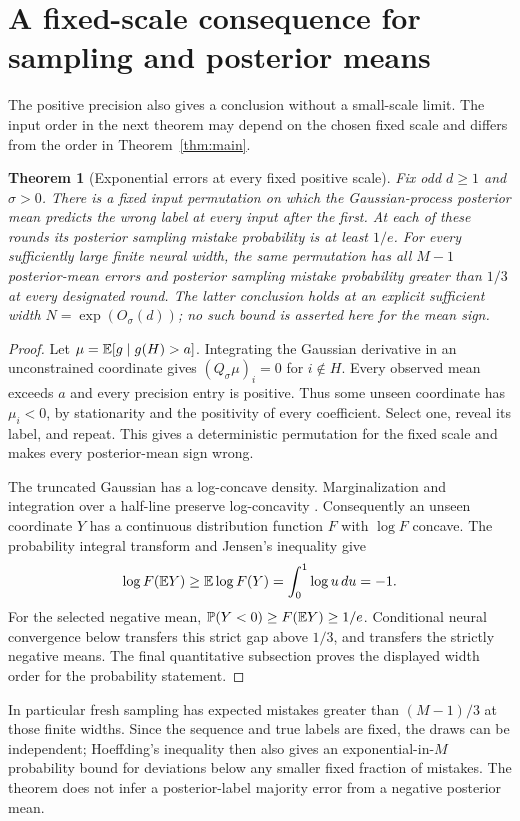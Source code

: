 \documentclass[11pt]{article}
\newtheorem{theorem}{Theorem}
\newcommand{\Pp}{\mathbb P}\newcommand{\one}{\mathbf1}
\begin{document}
\section{A fixed-scale consequence for sampling and posterior means}
The positive precision also gives a conclusion without a small-scale
limit. The input order in the next theorem may depend on the chosen
fixed scale and differs from the order in Theorem~\ref{thm:main}.

\begin{theorem}[Exponential errors at every fixed positive scale]\label{thm:fixed}
Fix odd $d\ge1$ and $\sigma>0$. There is a fixed input permutation
on which the Gaussian-process posterior mean predicts the wrong label
at every input after the first. At each of these rounds its posterior
sampling mistake probability is at least $1/e$.
For every sufficiently large finite neural width, the same permutation
has all $M-1$ posterior-mean errors and posterior sampling mistake
probability greater than $1/3$ at every designated round.
The latter conclusion holds at an explicit sufficient width
$N=\exp(O_\sigma(d))$; no such bound is asserted here for the mean sign.
\end{theorem}
\begin{proof}
Let $\mu=\mathbb E[g\mid g(H)>a]$. Integrating the Gaussian derivative in
an unconstrained coordinate gives $(Q_\sigma\mu)_i=0$ for $i\notin H$.
Every observed mean exceeds $a$ and every precision entry is positive.
Thus some unseen coordinate has $\mu_i<0$, by stationarity and the positivity of every coefficient. Select one, reveal its label, and repeat. This gives a deterministic
permutation for the fixed scale and makes every posterior-mean sign wrong.

The truncated Gaussian has a log-concave density. Marginalization and
integration over a half-line preserve log-concavity \cite{prekopa}.
Consequently an unseen coordinate $Y$ has a continuous distribution
function $F$ with $\log F$ concave. The probability integral transform
and Jensen's inequality give
\[
             \log F(\mathbb E Y)\ge\mathbb E\log F(Y)
                             =\int_0^1\log u\,du=-1.
\]
For the selected negative mean,
$\Pp(Y<0)\ge F(\E Y)\ge1/e$.
Conditional neural convergence below transfers this strict gap above
$1/3$, and transfers the strictly negative means. The final quantitative
subsection proves the displayed width order for the probability statement.
\end{proof}
In particular fresh sampling has expected mistakes greater than
$(M-1)/3$ at those finite widths. Since the sequence and true labels
are fixed, the draws can be independent; Hoeffding's inequality then
also gives an exponential-in-$M$ probability bound for deviations below
any smaller fixed fraction of mistakes. The theorem does not infer
a posterior-label majority error from a negative posterior mean.
\end{document}
